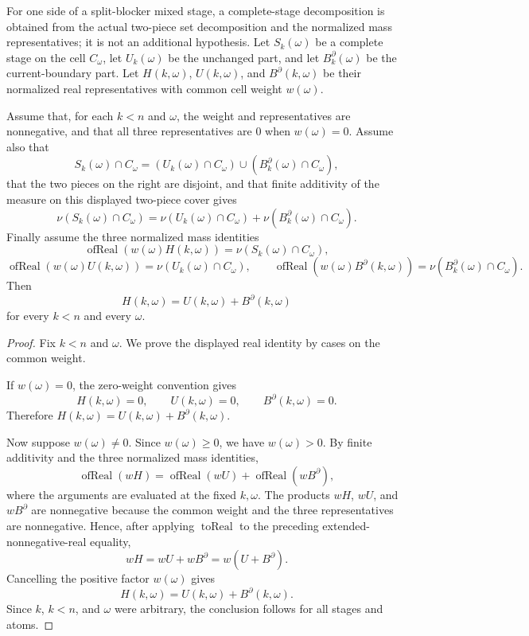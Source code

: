 \begin{helper}
For one side of a split-blocker mixed stage, a complete-stage decomposition
is obtained from the actual two-piece set decomposition and the normalized
mass representatives; it is not an additional hypothesis.  Let
\(S_k(\omega)\) be a complete stage on the cell \(C_\omega\), let
\(U_k(\omega)\) be the unchanged part, and let \(B_k^\partial(\omega)\) be the
current-boundary part.  Let \(H(k,\omega)\), \(U(k,\omega)\), and
\(B^\partial(k,\omega)\) be their normalized real representatives with common
cell weight \(w(\omega)\).

Assume that, for each \(k<n\) and \(\omega\), the weight and representatives
are nonnegative, and that all three representatives are \(0\) when
\(w(\omega)=0\).  Assume also that
\[
S_k(\omega)\cap C_\omega
 =
(U_k(\omega)\cap C_\omega)\cup(B_k^\partial(\omega)\cap C_\omega),
\]
that the two pieces on the right are disjoint, and that finite additivity of
the measure on this displayed two-piece cover gives
\[
\nu(S_k(\omega)\cap C_\omega)
 =
\nu(U_k(\omega)\cap C_\omega)
 +\nu(B_k^\partial(\omega)\cap C_\omega).
\]
Finally assume the three normalized mass identities
\[
\operatorname{ofReal}(w(\omega)H(k,\omega))
 = \nu(S_k(\omega)\cap C_\omega),
\]
\[
\operatorname{ofReal}(w(\omega)U(k,\omega))
 = \nu(U_k(\omega)\cap C_\omega),
\qquad
\operatorname{ofReal}(w(\omega)B^\partial(k,\omega))
 = \nu(B_k^\partial(\omega)\cap C_\omega).
\]
Then
\[
H(k,\omega)=U(k,\omega)+B^\partial(k,\omega)
\]
for every \(k<n\) and every \(\omega\).
\end{helper}
\begin{proof}
Fix \(k<n\) and \(\omega\).  We prove the displayed real identity by cases on
the common weight.

If \(w(\omega)=0\), the zero-weight convention gives
\[
H(k,\omega)=0,\qquad U(k,\omega)=0,\qquad
B^\partial(k,\omega)=0.
\]
Therefore \(H(k,\omega)=U(k,\omega)+B^\partial(k,\omega)\).

Now suppose \(w(\omega)\ne0\).  Since \(w(\omega)\ge0\), we have
\(w(\omega)>0\).  By finite additivity and the three normalized mass
identities,
\[
\operatorname{ofReal}(wH)
 =
\operatorname{ofReal}(wU)+\operatorname{ofReal}(wB^\partial),
\]
where the arguments are evaluated at the fixed \(k,\omega\).  The products
\(wH\), \(wU\), and \(wB^\partial\) are nonnegative because the common weight
and the three representatives are nonnegative.  Hence, after applying
\(\operatorname{toReal}\) to the preceding extended-nonnegative-real equality,
\[
wH=wU+wB^\partial=w(U+B^\partial).
\]
Cancelling the positive factor \(w(\omega)\) gives
\[
H(k,\omega)=U(k,\omega)+B^\partial(k,\omega).
\]
Since \(k\), \(k<n\), and \(\omega\) were arbitrary, the conclusion follows
for all stages and atoms.
\end{proof}
